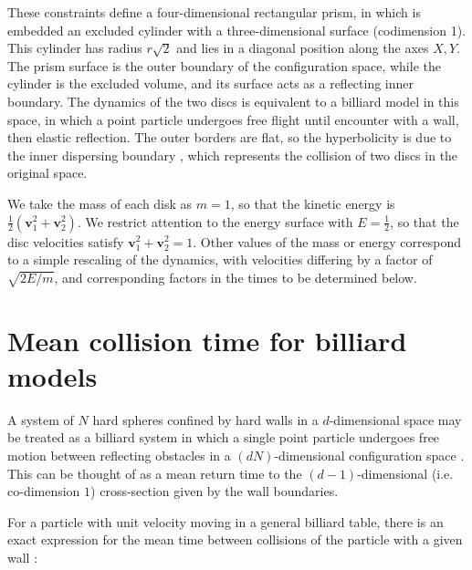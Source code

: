 \documentclass[superscriptaddress,pre,reprint,showpacs,onecolumn]{revtex4-1}
\begin{document}
These constraints define a four-dimensional
rectangular prism, in which is embedded an excluded cylinder with a three-dimensional surface
(codimension 1).
This cylinder has radius $r\sqrt{2}$ and lies
in  a diagonal position along the axes $X, Y$.
The prism surface is the outer boundary of the configuration space,
while the cylinder is the excluded volume, and its surface
acts as a reflecting inner boundary.
The dynamics of the two discs is equivalent to a billiard model in this space, in which 
a point particle undergoes free flight until
encounter with a wall, then elastic reflection.
The outer borders are flat, so the
hyperbolicity is due to the inner dispersing
boundary \cite{Sim99}, which represents the collision of
two discs in the original space.


We take the mass of each disk as $m=1$, so that the kinetic energy
is $\frac{1}{2}(\mathbf{v}_1^2 + \mathbf{v}_2^2)$. We restrict attention to the energy surface with
$E = \frac{1}{2}$, so that the disc velocities satisfy $\mathbf{v}_1^2 + \mathbf{v}_2^2 = 1$.
Other values of the mass or energy correspond to a simple rescaling of the dynamics, with velocities differing
by a factor of
$\sqrt{2E/m}$, and corresponding factors in the times to be determined below.


\section{Mean collision time for billiard models}

\label{knownfacts}

A system of $N$ hard spheres confined by hard walls in a $d$-dimensional
space may be treated as a billiard system 
in which a single point  particle undergoes free motion between reflecting obstacles 
in a $ (d N) $-dimensional configuration space \cite{Sinai70, Sim99, MarkChern}. 
This can be thought of as a mean return time to the $(d-1)$-dimensional 
(i.e. co-dimension $1$) cross-section given by the wall boundaries.

For a particle with unit velocity moving in a general billiard table, there is 
an exact expression for the mean time between 
collisions of the particle with a given wall \cite{Chernov97}:
\end{document}
